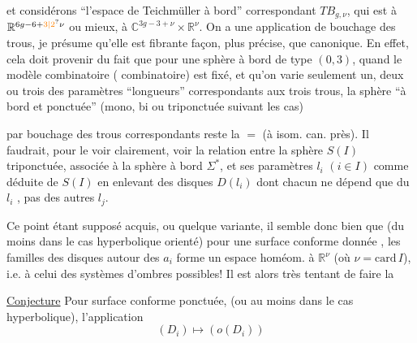 
et considérons ``l'espace de Teichmüller à bord'' correspondant  $TB_{g,\nu}$, qui est   à $\mathbb R^{6g-6+\unsure{3|2}\nu}$ ou mieux, à $\mathbb C^{3g-3+\nu}\times\mathbb R^\nu$. On a une application
de bouchage des trous, je présume qu'elle est fibrante  façon, plus précise, que   canonique.  En effet, cela doit provenir du fait que pour une sphère  à bord de type $(0,3)$,  quand le modèle combinatoire ( combinatoire) est fixé, et qu'on varie seulement  un, deux ou trois des paramètres ``longueurs'' correspondants aux trois trous, la sphère ``à bord et ponctuée'' (mono, bi ou triponctuée suivant les cas)  


par bouchage des trous correspondants reste la $=$ (à isom. can. près). Il faudrait, pour le voir clairement, voir la relation entre la sphère  $S(I)$ triponctuée, associée à la sphère à bord $\Sigma^*$, et ses paramètres $l_i$ $(i\in I)$ comme déduite  de $S(I)$ en enlevant des disques   $D(l_i)$  dont chacun ne dépend que du $l_i$ , pas des autres $l_j$.

Ce point étant supposé acquis, ou quelque variante, il semble donc bien que (du moins dans le cas hyperbolique orienté) pour une surface conforme  donnée , les familles  des disques autour des $a_i$ forme un espace homéom. à $\mathbb R^\nu$ (où $\nu=\mathrm{card}\,I$), i.e. à celui des systèmes d'ombres possibles! Il est alors très tentant de faire la

\uline{Conjecture} Pour  surface conforme ponctuée, (ou  au moins dans le cas hyperbolique), l'application 
\[
(D_i)\longmapsto (o(D_i))
\]
